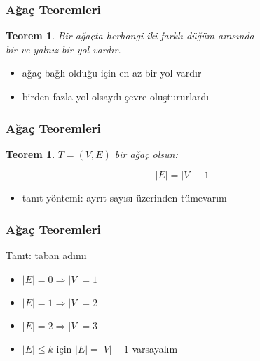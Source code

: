 \documentclass[dvipsnames]{beamer}
\theoremstyle{definition}
\theoremstyle{example}
\theoremstyle{plain}
\newtheorem{teorem}[theorem]{Teorem}
\begin{document}
\begin{frame}
  \frametitle{Ağaç Teoremleri}

  \begin{teorem}
    Bir ağaçta herhangi iki farklı düğüm arasında\\
    bir ve yalnız bir yol vardır.
  \end{teorem}

  \begin{itemize}
    \item ağaç bağlı olduğu için en az bir yol vardır
    \item birden fazla yol olsaydı çevre oluştururlardı
    \medskip
    \begin{center}
    \end{center}
  \end{itemize}
\end{frame}

\begin{frame}
  \frametitle{Ağaç Teoremleri}

  \begin{teorem}
    $T = (V, E)$ bir ağaç olsun:

    \[|E| = |V| - 1\]
  \end{teorem}

  \begin{itemize}
    \item tanıt yöntemi: ayrıt sayısı üzerinden tümevarım
  \end{itemize}
\end{frame}

\begin{frame}
  \frametitle{Ağaç Teoremleri}

  \begin{block}{Tanıt: taban adımı}
    \begin{itemize}
      \item $|E|=0 \Rightarrow |V|=1$
      \item $|E|=1 \Rightarrow |V|=2$
      \item $|E|=2 \Rightarrow |V|=3$

      \pause
      \medskip
      \item $|E| \leq k$ için $|E| = |V| - 1$ varsayalım
    \end{itemize}
  \end{block}
\end{frame}
\end{document}
